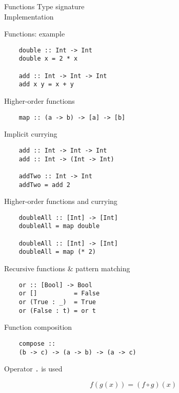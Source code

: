 \documentclass[20pt]{beamer}
\newcommand{\vspaced}{
    \vspace{5mm}
}
\begin{document}
\begin{frame}{Functions}
    Type signature \\
    Implementation
\end{frame}

\begin{frame}[fragile]{Functions: example}
    \begin{lstlisting}
    double :: Int -> Int
    double x = 2 * x

    add :: Int -> Int -> Int
    add x y = x + y
    \end{lstlisting}
\end{frame}

\begin{frame}[fragile]{Higher-order functions}
    \begin{lstlisting}
    map :: (a -> b) -> [a] -> [b]
    \end{lstlisting}
\end{frame}

\begin{frame}[fragile]{Implicit currying}
    \begin{lstlisting}
    add :: Int -> Int -> Int
    add :: Int -> (Int -> Int)

    addTwo :: Int -> Int
    addTwo = add 2
    \end{lstlisting}
\end{frame}

\begin{frame}[fragile]{Higher-order functions and currying}
    \begin{lstlisting}
    doubleAll :: [Int] -> [Int]
    doubleAll = map double

    doubleAll :: [Int] -> [Int]
    doubleAll = map (* 2)
    \end{lstlisting}
\end{frame}

\begin{frame}[fragile]{Recursive functions \& pattern matching}
    \begin{lstlisting}
    or :: [Bool] -> Bool
    or []          = False
    or (True : _)  = True
    or (False : t) = or t
    \end{lstlisting}
\end{frame}

\begin{frame}[fragile]{Function composition}
    \begin{lstlisting}
    compose ::
    (b -> c) -> (a -> b) -> (a -> c)
    \end{lstlisting}
    
    \vspaced
    Operator \texttt{.} is used

    \begin{equation*}
        f(g(x)) = (f \circ g)(x)
    \end{equation*}
\end{frame}
\end{document}
